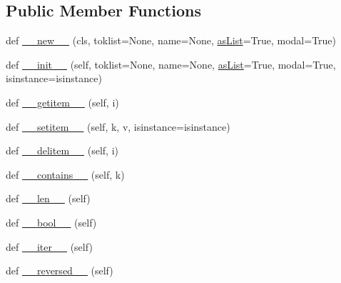 \subsection*{Public Member Functions}
\begin{DoxyCompactItemize}
\item 
def \hyperlink{classpkg__resources_1_1__vendor_1_1pyparsing_1_1ParseResults_adb1f118b2daee9f36c51bff263009901}{\+\_\+\+\_\+new\+\_\+\+\_\+} (cls, toklist=None, name=None, \hyperlink{classpkg__resources_1_1__vendor_1_1pyparsing_1_1ParseResults_aa7e886aa0826871511b189660343f3aa}{as\+List}=True, modal=True)
\item 
def \hyperlink{classpkg__resources_1_1__vendor_1_1pyparsing_1_1ParseResults_a32484b94a9503cdb4abe2e4e02abdb99}{\+\_\+\+\_\+init\+\_\+\+\_\+} (self, toklist=None, name=None, \hyperlink{classpkg__resources_1_1__vendor_1_1pyparsing_1_1ParseResults_aa7e886aa0826871511b189660343f3aa}{as\+List}=True, modal=True, isinstance=isinstance)
\item 
def \hyperlink{classpkg__resources_1_1__vendor_1_1pyparsing_1_1ParseResults_ab72c8f6214107ccb87c15e1ceffc89fb}{\+\_\+\+\_\+getitem\+\_\+\+\_\+} (self, i)
\item 
def \hyperlink{classpkg__resources_1_1__vendor_1_1pyparsing_1_1ParseResults_add107f9bf8d6fcb3d1287e42d2e54a1f}{\+\_\+\+\_\+setitem\+\_\+\+\_\+} (self, k, v, isinstance=isinstance)
\item 
def \hyperlink{classpkg__resources_1_1__vendor_1_1pyparsing_1_1ParseResults_a918fd87f312ef86db977651bd3036362}{\+\_\+\+\_\+delitem\+\_\+\+\_\+} (self, i)
\item 
def \hyperlink{classpkg__resources_1_1__vendor_1_1pyparsing_1_1ParseResults_ae170efc8f8e811e04a47f1ffb6323f8a}{\+\_\+\+\_\+contains\+\_\+\+\_\+} (self, k)
\item 
def \hyperlink{classpkg__resources_1_1__vendor_1_1pyparsing_1_1ParseResults_ac466bfd2b9fc9fb7fa3b505cd865f00b}{\+\_\+\+\_\+len\+\_\+\+\_\+} (self)
\item 
def \hyperlink{classpkg__resources_1_1__vendor_1_1pyparsing_1_1ParseResults_aea60c6a9c5add6406a63c4457f2b144e}{\+\_\+\+\_\+bool\+\_\+\+\_\+} (self)
\item 
def \hyperlink{classpkg__resources_1_1__vendor_1_1pyparsing_1_1ParseResults_a34ff2cc2db260ee5510484cc1d327d0e}{\+\_\+\+\_\+iter\+\_\+\+\_\+} (self)
\item 
def \hyperlink{classpkg__resources_1_1__vendor_1_1pyparsing_1_1ParseResults_a0acbee423a6d3df69d18c000660d7c7a}{\+\_\+\+\_\+reversed\+\_\+\+\_\+} (self)

\end{DoxyCompactItemize}
